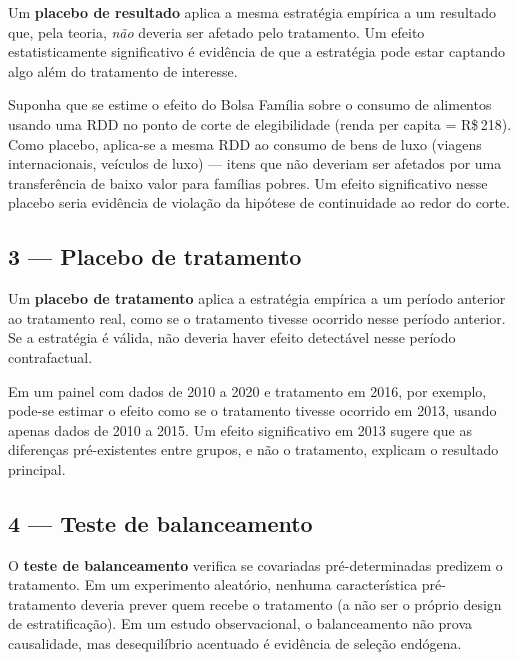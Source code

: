 Um \textbf{placebo de resultado} aplica a mesma estratégia empírica a um resultado que, pela teoria, \textit{não} deveria ser afetado pelo tratamento. Um efeito estatisticamente significativo é evidência de que a estratégia pode estar captando algo além do tratamento de interesse.

\begin{exemplobox}
Suponha que se estime o efeito do Bolsa Família sobre o consumo de alimentos usando uma RDD no ponto de corte de elegibilidade (renda per capita = R\$\,218). Como placebo, aplica-se a mesma RDD ao consumo de bens de luxo (viagens internacionais, veículos de luxo) — itens que não deveriam ser afetados por uma transferência de baixo valor para famílias pobres. Um efeito significativo nesse placebo seria evidência de violação da hipótese de continuidade ao redor do corte.
\end{exemplobox}

\subsection*{3 — Placebo de tratamento}

Um \textbf{placebo de tratamento} aplica a estratégia empírica a um período anterior ao tratamento real, como se o tratamento tivesse ocorrido nesse período anterior. Se a estratégia é válida, não deveria haver efeito detectável nesse período contrafactual.

Em um painel com dados de 2010 a 2020 e tratamento em 2016, por exemplo, pode-se estimar o efeito como se o tratamento tivesse ocorrido em 2013, usando apenas dados de 2010 a 2015. Um efeito significativo em 2013 sugere que as diferenças pré-existentes entre grupos, e não o tratamento, explicam o resultado principal.

\subsection*{4 — Teste de balanceamento}

O \textbf{teste de balanceamento} verifica se covariadas pré-determinadas predizem o tratamento. Em um experimento aleatório, nenhuma característica pré-tratamento deveria prever quem recebe o tratamento (a não ser o próprio design de estratificação). Em um estudo observacional, o balanceamento não prova causalidade, mas desequilíbrio acentuado é evidência de seleção endógena.

